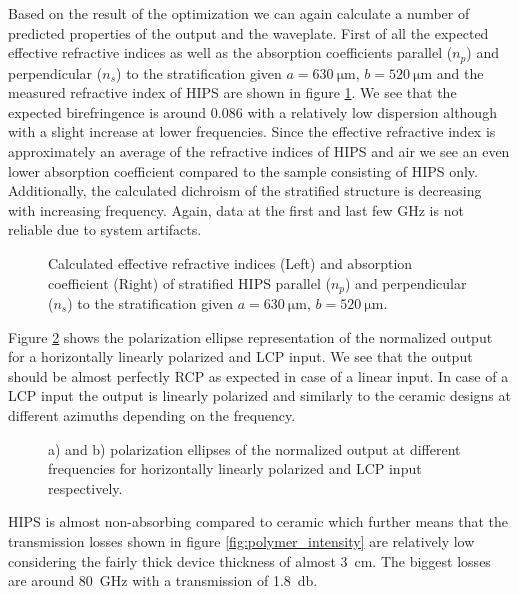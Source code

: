 Based on the result of the optimization we can again calculate a number of predicted properties of the output and the waveplate. First of all the expected effective refractive indices as well as the absorption coefficients parallel ($n_p$) and perpendicular ($n_s$) to the stratification given $a=\SI{630}{\micro \meter}$, $b=\SI{520}{\micro \meter}$ and the measured refractive index of HIPS are shown in figure \ref{fig:effective_ri_bf_hips}. We see that the expected birefringence is around $0.086$ with a relatively low dispersion although with a slight increase at lower frequencies. Since the effective refractive index is approximately an average of the refractive indices of HIPS and air we see an even lower absorption coefficient compared to the sample consisting of HIPS only. Additionally, the calculated dichroism of the stratified structure is decreasing with increasing frequency. Again, data at the first and last few \si{\giga \hertz} is not reliable due to system artifacts.

\begin{figure}[H]
    \centering
    
    \caption{Calculated effective refractive indices (Left) and absorption coefficient (Right) of stratified HIPS parallel ($n_p$) and perpendicular ($n_s$) to the stratification given $a=\SI{630}{\micro \meter}$, $b=\SI{520}{\micro \meter}$.}
    \label{fig:effective_ri_bf_hips}
\end{figure}

Figure \ref{fig:polymer_pe_lp} shows the polarization ellipse representation of the normalized output for a horizontally linearly polarized and LCP input. We see that the output should be almost perfectly RCP as expected in case of a linear input. In case of a LCP input the output is linearly polarized and similarly to the  ceramic designs at different azimuths depending on the frequency. 

\begin{figure}[H]
    \centering
    
    \caption{a) and b) polarization ellipses of the normalized output at different frequencies for horizontally linearly polarized and LCP input respectively.}
    \label{fig:polymer_pe_lp}
\end{figure}

HIPS is almost non-absorbing compared to  ceramic which further means that the transmission losses shown in figure \ref{fig:polymer_intensity} are relatively low considering the fairly thick device thickness of almost \SI{3}{\centi \meter}. The biggest losses are around \SI{80}{\giga \hertz} with a transmission of \SI{1.8}{\decibel}.

